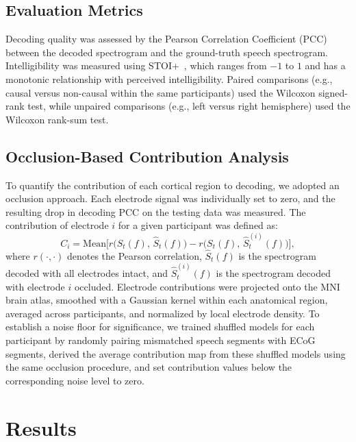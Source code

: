 \documentclass[10pt]{article}
\begin{document}
\subsection{Evaluation Metrics}

Decoding quality was assessed by the Pearson Correlation Coefficient (PCC) between the decoded spectrogram and the ground-truth speech spectrogram. Intelligibility was measured using STOI+~\cite{taal2011algorithm,relanoiborra2016sepsm}, which ranges from $-1$ to $1$ and has a monotonic relationship with perceived intelligibility. Paired comparisons (e.g., causal versus non-causal within the same participants) used the Wilcoxon signed-rank test, while unpaired comparisons (e.g., left versus right hemisphere) used the Wilcoxon rank-sum test.

\subsection{Occlusion-Based Contribution Analysis}

To quantify the contribution of each cortical region to decoding, we adopted an occlusion approach. Each electrode signal was individually set to zero, and the resulting drop in decoding PCC on the testing data was measured. The contribution of electrode $i$ for a given participant was defined as:
\begin{equation}
C_i = \mathrm{Mean}\bigl[r\bigl(S_t(f),\,\hat{S}_t(f)\bigr) - r\bigl(S_t(f),\,\hat{S}_t^{(i)}(f)\bigr)\bigr],
\end{equation}
where $r(\cdot,\cdot)$ denotes the Pearson correlation, $\hat{S}_t(f)$ is the spectrogram decoded with all electrodes intact, and $\hat{S}_t^{(i)}(f)$ is the spectrogram decoded with electrode $i$ occluded. Electrode contributions were projected onto the MNI brain atlas, smoothed with a Gaussian kernel within each anatomical region, averaged across participants, and normalized by local electrode density. To establish a noise floor for significance, we trained shuffled models for each participant by randomly pairing mismatched speech segments with ECoG segments, derived the average contribution map from these shuffled models using the same occlusion procedure, and set contribution values below the corresponding noise level to zero.

\section{Results}
\end{document}
